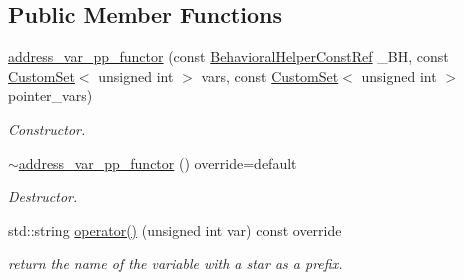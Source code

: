 \subsection*{Public Member Functions}
\begin{DoxyCompactItemize}
\item 
\hyperlink{structaddress__var__pp__functor_ab4da8d516695d734d6853a0ec8b6af81}{address\+\_\+var\+\_\+pp\+\_\+functor} (const \hyperlink{behavioral__helper_8hpp_aae973b54cac87eef3b27442aa3e1e425}{Behavioral\+Helper\+Const\+Ref} \+\_\+\+BH, const \hyperlink{custom__set_8hpp_a615bc2f42fc38a4bb1790d12c759e86f}{Custom\+Set}$<$ unsigned int $>$ vars, const \hyperlink{custom__set_8hpp_a615bc2f42fc38a4bb1790d12c759e86f}{Custom\+Set}$<$ unsigned int $>$ pointer\+\_\+vars)
\begin{DoxyCompactList}\small\item\em Constructor. \end{DoxyCompactList}\item 
\hyperlink{structaddress__var__pp__functor_a084e036b64fd851004f8fe0e7f2282fe}{$\sim$address\+\_\+var\+\_\+pp\+\_\+functor} () override=default
\begin{DoxyCompactList}\small\item\em Destructor. \end{DoxyCompactList}\item 
std\+::string \hyperlink{structaddress__var__pp__functor_a53bd3e80f4e77c018125c61d54001744}{operator()} (unsigned int var) const override
\begin{DoxyCompactList}\small\item\em return the name of the variable with a star as a prefix. \end{DoxyCompactList}\end{DoxyCompactItemize}
